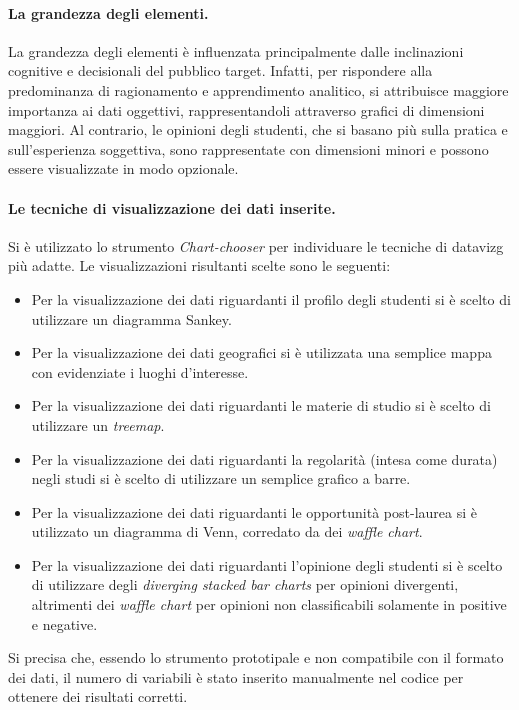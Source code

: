 \paragraph{La grandezza degli elementi.} La grandezza degli elementi è influenzata principalmente dalle inclinazioni cognitive e decisionali del pubblico target. 
Infatti, per rispondere alla predominanza di ragionamento e apprendimento analitico, si attribuisce maggiore importanza ai dati oggettivi, rappresentandoli attraverso grafici di dimensioni maggiori. 
Al contrario, le opinioni degli studenti, che si basano più sulla pratica e sull'esperienza soggettiva, sono rappresentate con dimensioni minori e possono essere visualizzate in modo opzionale.

\paragraph{Le tecniche di visualizzazione dei dati inserite.}
Si è utilizzato lo strumento \emph{Chart-chooser} per individuare le tecniche di \gls{datavizg} più adatte. 
Le visualizzazioni risultanti scelte sono le seguenti:
\begin{itemize}
    \item Per la visualizzazione dei dati riguardanti il profilo degli studenti si è scelto di utilizzare un diagramma Sankey. 
    \item Per la visualizzazione dei dati geografici si è utilizzata una semplice mappa con evidenziate i luoghi d'interesse.
    \item Per la visualizzazione dei dati riguardanti le materie di studio si è scelto di utilizzare un \emph{treemap}.
    \item Per la visualizzazione dei dati riguardanti la regolarità (intesa come durata) negli studi si è scelto di utilizzare un semplice grafico a barre.
    \item Per la visualizzazione dei dati riguardanti le opportunità post-laurea si è utilizzato un diagramma di Venn, corredato da dei \emph{waffle chart}.
    \item Per la visualizzazione dei dati riguardanti l'opinione degli studenti si è scelto di utilizzare degli \emph{diverging stacked bar charts} per opinioni
    divergenti, altrimenti dei \emph{waffle chart} per opinioni non classificabili solamente in positive e negative.
\end{itemize}
Si precisa che, essendo lo strumento prototipale e non compatibile con il formato dei dati, il numero di variabili è stato inserito manualmente nel codice per ottenere dei risultati corretti.

